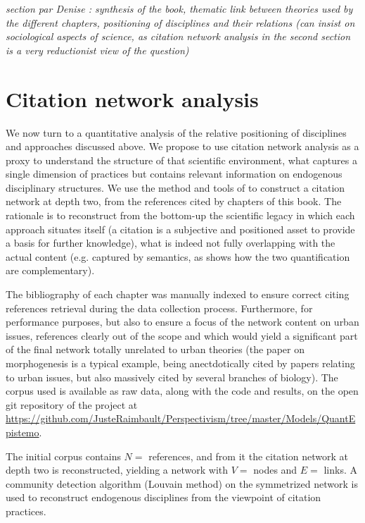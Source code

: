\textit{section par Denise : synthesis of the book, thematic link between theories used by the different chapters, positioning of disciplines and their relations (can insist on sociological aspects of science, as citation network analysis in the second section is a very reductionist view of the question)}



\section{Citation network analysis}

We now turn to a quantitative analysis of the relative positioning of disciplines and approaches discussed above. We propose to use citation network analysis as a proxy to understand the structure of that scientific environment, what captures a single dimension of practices but contains relevant information on endogenous disciplinary structures. We use the method and tools of \cite{Raimbault2019} to construct a citation network at depth two, from the references cited by chapters of this book. The rationale is to reconstruct from the bottom-up the scientific legacy in which each approach situates itself (a citation is a subjective and positioned asset to provide a basis for further knowledge), what is indeed not fully overlapping with the actual content (e.g. captured by semantics, as \cite{banos2018spatialised} shows how the two quantification are complementary).


The bibliography of each chapter was manually indexed to ensure correct citing references retrieval during the data collection process. Furthermore, for performance purposes, but also to ensure a focus of the network content on urban issues, references clearly out of the scope and which would yield a significant part of the final network totally unrelated to urban theories (the paper on morphogenesis \cite{turing1990chemical} is a typical example, being anectdotically cited by papers relating to urban issues, but also massively cited by several branches of biology). The corpus used is available as raw data, along with the code and results, on the open git repository of the project at \url{https://github.com/JusteRaimbault/Perspectivism/tree/master/Models/QuantEpistemo}.


The initial corpus contains $N=$ references, and from it the citation network at depth two is reconstructed, yielding a network with $V=$ nodes and $E=$ links.
A community detection algorithm (Louvain method) on the symmetrized network is used to reconstruct endogenous disciplines from the viewpoint of citation practices.

